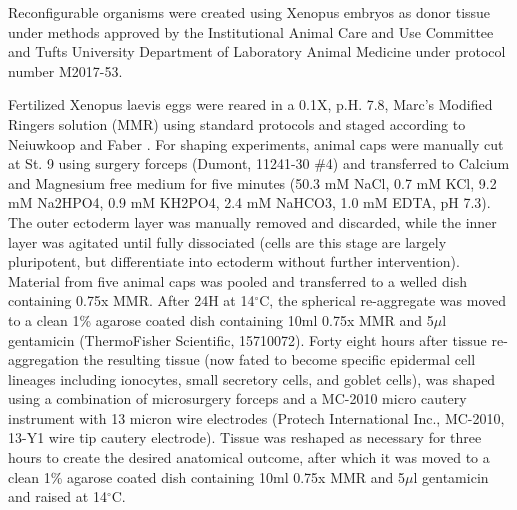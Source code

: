 Reconfigurable organisms were created using Xenopus embryos as donor tissue under methods approved by the Institutional Animal Care and Use Committee and Tufts University Department of Laboratory Animal Medicine under protocol number M2017-53. 

Fertilized Xenopus laevis eggs were reared in a 0.1X, p.H. 7.8, Marc's Modified Ringers solution (MMR) using standard protocols and staged according to Neiuwkoop and Faber \cite{nieuwkoop1956normal,sive2000early}. 
For shaping experiments, animal caps were manually cut at St. 9 using surgery forceps (Dumont, 11241-30 \#4) and transferred to Calcium and Magnesium free medium for five minutes (50.3 mM NaCl, 0.7 mM KCl, 9.2 mM Na2HPO4, 0.9 mM KH2PO4, 2.4 mM NaHCO3, 1.0 mM EDTA, pH 7.3). 
The outer ectoderm layer was manually removed and discarded, while the inner layer was agitated until fully dissociated (cells are this stage are largely pluripotent, but differentiate into ectoderm without further intervention). Material from five animal caps was pooled and transferred to a welled dish containing 0.75x MMR. 
After 24H at 14{$^{\circ}$}C, the spherical re-aggregate was moved to a clean 1\% agarose coated dish containing 10ml 0.75x MMR and 5{$\mu$}l gentamicin (ThermoFisher Scientific, 15710072). 
Forty eight hours after tissue re-aggregation the resulting tissue (now fated to become specific epidermal cell lineages including ionocytes, small secretory cells, and goblet cells), was shaped using a combination of microsurgery forceps and a MC-2010 micro cautery instrument with 13 micron wire electrodes (Protech International Inc., MC-2010, 13-Y1 wire tip cautery electrode). 
Tissue was reshaped as necessary for three hours to create the desired anatomical outcome, after which it was moved to a clean 1\% agarose coated dish containing 10ml 0.75x MMR and 5{$\mu$}l gentamicin and raised at 14{$^{\circ}$}C.

